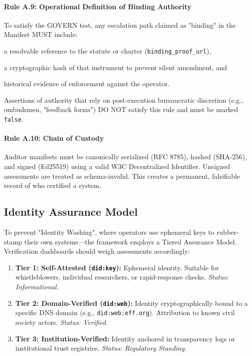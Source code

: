\documentclass{article}
\begin{document}
\paragraph{Rule A.9: Operational Definition of Binding Authority}
To satisfy the GOVERN test, any escalation path claimed as "binding" in the Manifest MUST include:
\begin{enumerate*}[label=(\roman*)]
    \item a resolvable reference to the statute or charter (\texttt{binding\_proof\_url}),
    \item a cryptographic hash of that instrument to prevent silent amendment, and
    \item historical evidence of enforcement against the operator.
\end{enumerate*}
Assertions of authority that rely on post-execution bureaucratic discretion (e.g., ombudsmen, "feedback forms") DO NOT satisfy this rule and must be marked \texttt{false}.

\paragraph{Rule A.10: Chain of Custody}
Auditor manifests must be canonically serialized (RFC 8785), hashed (SHA-256), and signed (Ed25519) using a valid W3C Decentralized Identifier. Unsigned assessments are treated as schema-invalid. This creates a permanent, falsifiable record of who certified a system.

\subsection{Identity Assurance Model}

To prevent "Identity Washing", where operators use ephemeral keys to rubber-stamp their own systems---the framework employs a Tiered Assurance Model. Verification dashboards should weigh assessments accordingly:

\begin{enumerate}
    \item \textbf{Tier 1: Self-Attested (\texttt{did:key}):} Ephemeral identity. Suitable for whistleblowers, individual researchers, or rapid-response checks. \textit{Status: Informational.}
    \item \textbf{Tier 2: Domain-Verified (\texttt{did:web}):} Identity cryptographically bound to a specific DNS domain (e.g., \texttt{did:web:eff.org}). Attribution to known civil society actors. \textit{Status: Verified.}
    \item \textbf{Tier 3: Institution-Verified:} Identity anchored in transparency logs or institutional trust registries. \textit{Status: Regulatory Standing.}
\end{enumerate}
\end{document}
